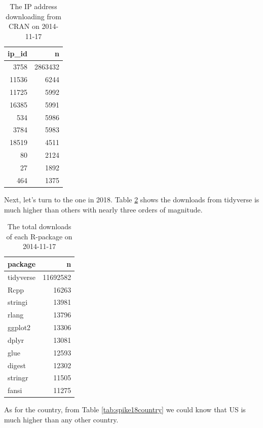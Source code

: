 \documentclass[
]{book}
\begin{document}
\begin{table}

\caption{\label{tab:spike14ip}The IP address downloading from CRAN on 2014-11-17}
\centering
\begin{tabular}[t]{r|r}
\hline
ip\_id & n\\
\hline
3758 & 2863432\\
\hline
11536 & 6244\\
\hline
11725 & 5992\\
\hline
16385 & 5991\\
\hline
534 & 5986\\
\hline
3784 & 5983\\
\hline
18519 & 4511\\
\hline
80 & 2124\\
\hline
27 & 1892\\
\hline
464 & 1375\\
\hline
\end{tabular}
\end{table}

Next, let's turn to the one in 2018. Table \ref{tab:spike18count} shows the downloads from tidyverse is much higher than others with nearly three orders of magnitude.

\begin{table}

\caption{\label{tab:spike18count}The total downloads of each R-package on 2014-11-17}
\centering
\begin{tabular}[t]{l|r}
\hline
package & n\\
\hline
tidyverse & 11692582\\
\hline
Rcpp & 16263\\
\hline
stringi & 13981\\
\hline
rlang & 13796\\
\hline
ggplot2 & 13306\\
\hline
dplyr & 13081\\
\hline
glue & 12593\\
\hline
digest & 12302\\
\hline
stringr & 11505\\
\hline
fansi & 11275\\
\hline
\end{tabular}
\end{table}

As for the country, from Table \ref{tab:spike18country} we could know that US is much higher than any other country.
\end{document}
